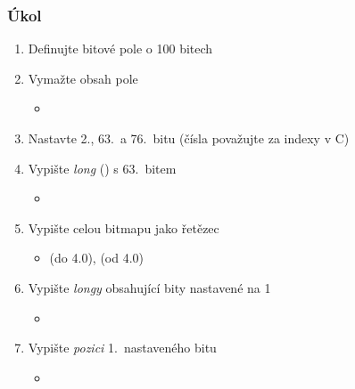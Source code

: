 \begin{frame}
  \frametitle{Úkol}

  \begin{enumerate}
    \item Definujte bitové pole o 100 bitech
    \item Vymažte obsah pole
    \begin{itemize}
      \item {}
    \end{itemize}

    \item Nastavte 2., 63.\ a 76.\ bitu (čísla považujte za indexy v C)
    \item Vypište \emph{long} () s 63.\ bitem
    \begin{itemize}
      \item {}
    \end{itemize}

    \item Vypište celou bitmapu jako řetězec
    \begin{itemize}
      \item {} (do 4.0),  (od 4.0)
    \end{itemize}

    \item Vypište \emph{longy} obsahující bity nastavené na 1
    \begin{itemize}
      \item {}
    \end{itemize}

    \item Vypište \emph{pozici} 1.\ nastaveného bitu
    \begin{itemize}
      \item {}
    \end{itemize}
  \end{enumerate}
\end{frame}


